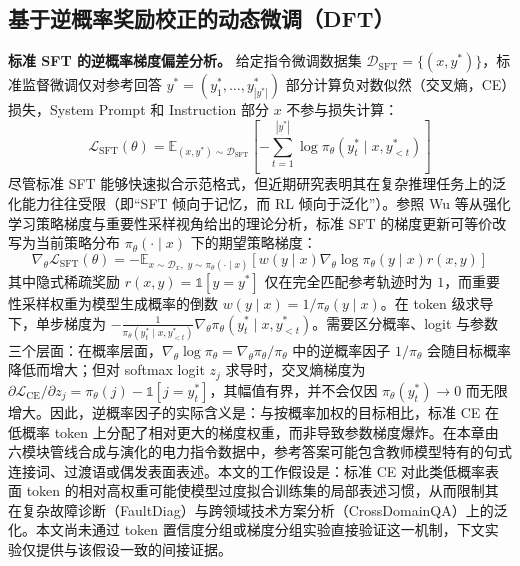 \documentclass[fontset=fandol,type=master,campus=shenzhen,etitleauto=true]{hithesisbook}
\begin{document}
\subsection{基于逆概率奖励校正的动态微调（DFT）}\label{ux8badux7ec3ux914dux7f6eux4e0eux4f18ux5316}

\textbf{标准 SFT 的逆概率梯度偏差分析。} 给定指令微调数据集 $\mathcal{D}_{\text{SFT}} = \{(x, y^*)\}$，标准监督微调仅对参考回答 $y^* = (y_1^*, \ldots, y_{|y^*|}^*)$ 部分计算负对数似然（交叉熵，CE）损失，System Prompt 和 Instruction 部分 $x$ 不参与损失计算：
\begin{equation}
\mathcal{L}_{\text{SFT}}(\theta) = \mathbb{E}_{(x, y^*) \sim \mathcal{D}_{\text{SFT}}} \left[ -\sum_{t=1}^{|y^*|} \log \pi_\theta(y_t^* \mid x, y_{<t}^*) \right]
\end{equation}
尽管标准 SFT 能够快速拟合示范格式，但近期研究表明其在复杂推理任务上的泛化能力往往受限（即``SFT 倾向于记忆，而 RL 倾向于泛化''）。参照 Wu 等\cite{ref82}从强化学习策略梯度与重要性采样视角给出的理论分析，标准 SFT 的梯度更新可等价改写为当前策略分布 $\pi_\theta(\cdot \mid x)$ 下的期望策略梯度：
\begin{equation}
\nabla_\theta \mathcal{L}_{\text{SFT}}(\theta) = -\mathbb{E}_{x \sim \mathcal{D}_x,\; y \sim \pi_\theta(\cdot \mid x)} \left[ w(y \mid x) \nabla_\theta \log \pi_\theta(y \mid x) r(x, y) \right]
\end{equation}
其中隐式稀疏奖励 $r(x, y) = \mathbb{1}[y = y^*]$ 仅在完全匹配参考轨迹时为 $1$，而重要性采样权重为模型生成概率的倒数 $w(y \mid x) = 1 / \pi_\theta(y \mid x)$。在 token 级求导下，单步梯度为 $-\frac{1}{\pi_\theta(y_t^* \mid x, y_{<t}^*)} \nabla_\theta \pi_\theta(y_t^* \mid x, y_{<t}^*)$。需要区分概率、logit 与参数三个层面：在概率层面，$\nabla_\theta \log \pi_\theta = \nabla_\theta \pi_\theta / \pi_\theta$ 中的逆概率因子 $1/\pi_\theta$ 会随目标概率降低而增大；但对 softmax logit $z_j$ 求导时，交叉熵梯度为 $\partial \mathcal{L}_{\text{CE}} / \partial z_j = \pi_\theta(j) - \mathbb{1}[j = y_t^*]$，其幅值有界，并不会仅因 $\pi_\theta(y_t^*) \to 0$ 而无限增大。因此，逆概率因子的实际含义是：与按概率加权的目标相比，标准 CE 在低概率 token 上分配了相对更大的梯度权重，而非导致参数梯度爆炸。在本章由六模块管线合成与演化的电力指令数据中，参考答案可能包含教师模型特有的句式连接词、过渡语或偶发表面表述。本文的工作假设是：标准 CE 对此类低概率表面 token 的相对高权重可能使模型过度拟合训练集的局部表述习惯，从而限制其在复杂故障诊断（FaultDiag）与跨领域技术方案分析（CrossDomainQA）上的泛化。本文尚未通过 token 置信度分组或梯度分组实验直接验证这一机制，下文实验仅提供与该假设一致的间接证据。
\end{document}
